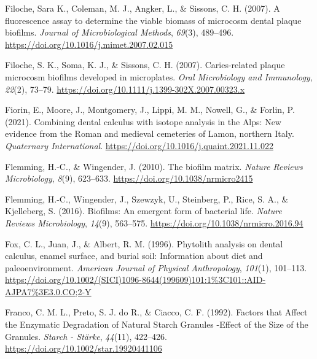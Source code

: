 \documentclass[
  letterpaper,
]{book}
\newlength{\cslhangindent}
\newlength{\cslentryspacingunit} %
\newenvironment{CSLReferences}[2] %
 {%
  \setlength{\parindent}{0pt}
  \ifodd #1
  \let\oldpar\par
  \def\par{\hangindent=\cslhangindent\oldpar}
  \fi
  \setlength{\parskip}{#2\cslentryspacingunit}
 }%
 {}
\begin{document}
\begin{CSLReferences}{1}{0}
\leavevmode{}%
Filoche, Sara K., Coleman, M. J., Angker, L., \& Sissons, C. H. (2007).
A fluorescence assay to determine the viable biomass of microcosm dental
plaque biofilms. \emph{Journal of Microbiological Methods},
\emph{69}(3), 489--496.
\url{https://doi.org/10.1016/j.mimet.2007.02.015}

\leavevmode{}%
Filoche, S. K., Soma, K. J., \& Sissons, C. H. (2007). Caries-related
plaque microcosm biofilms developed in microplates. \emph{Oral
Microbiology and Immunology}, \emph{22}(2), 73--79.
\url{https://doi.org/10.1111/j.1399-302X.2007.00323.x}

\leavevmode{}%
Fiorin, E., Moore, J., Montgomery, J., Lippi, M. M., Nowell, G., \&
Forlin, P. (2021). Combining dental calculus with isotope analysis in
the {Alps}: {New} evidence from the {Roman} and medieval cemeteries of
{Lamon}, northern {Italy}. \emph{Quaternary International}.
\url{https://doi.org/10.1016/j.quaint.2021.11.022}

\leavevmode{}%
Flemming, H.-C., \& Wingender, J. (2010). The biofilm matrix.
\emph{Nature Reviews Microbiology}, \emph{8}(9), 623--633.
\url{https://doi.org/10.1038/nrmicro2415}

\leavevmode{}%
Flemming, H.-C., Wingender, J., Szewzyk, U., Steinberg, P., Rice, S. A.,
\& Kjelleberg, S. (2016). Biofilms: An emergent form of bacterial life.
\emph{Nature Reviews Microbiology}, \emph{14}(9), 563--575.
\url{https://doi.org/10.1038/nrmicro.2016.94}

\leavevmode{}%
Fox, C. L., Juan, J., \& Albert, R. M. (1996). Phytolith analysis on
dental calculus, enamel surface, and burial soil: {Information} about
diet and paleoenvironment. \emph{American Journal of Physical
Anthropology}, \emph{101}(1), 101--113.
\url{https://doi.org/10.1002/(SICI)1096-8644(199609)101:1\%3C101::AID-AJPA7\%3E3.0.CO;2-Y}

\leavevmode{}%
Franco, C. M. L., Preto, S. J. do R., \& Ciacco, C. F. (1992). Factors
that {Affect} the {Enzymatic Degradation} of {Natural Starch Granules}
-{Effect} of the {Size} of the {Granules}. \emph{Starch - Stärke},
\emph{44}(11), 422--426. \url{https://doi.org/10.1002/star.19920441106}


\end{CSLReferences}
\end{document}
